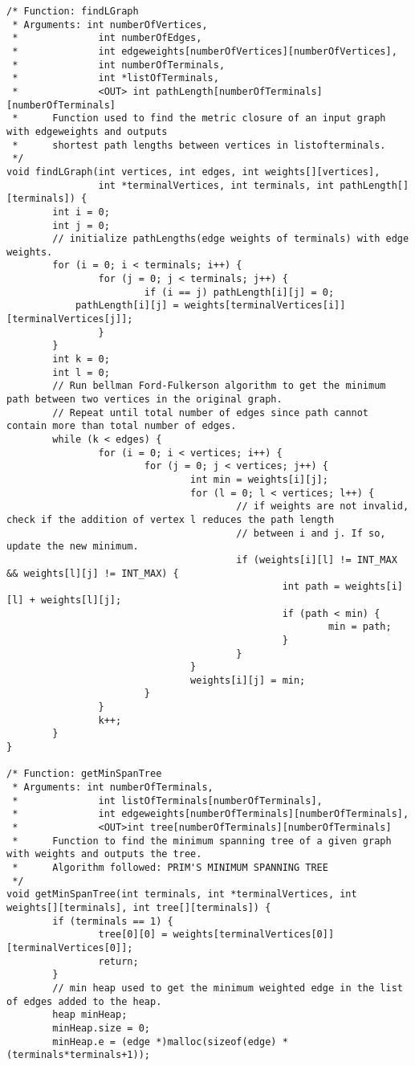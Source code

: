 \documentclass[a4paper]{article}
\begin{document}
\begin{lstlisting}
/* Function: findLGraph
 * Arguments: int numberOfVertices,
 *              int numberOfEdges,
 *              int edgeweights[numberOfVertices][numberOfVertices],
 *              int numberOfTerminals,
 *              int *listOfTerminals,
 *              <OUT> int pathLength[numberOfTerminals][numberOfTerminals]
 *      Function used to find the metric closure of an input graph with edgeweights and outputs
 *      shortest path lengths between vertices in listofterminals.
 */
void findLGraph(int vertices, int edges, int weights[][vertices],
                int *terminalVertices, int terminals, int pathLength[][terminals]) {
        int i = 0;
        int j = 0;
        // initialize pathLengths(edge weights of terminals) with edge weights.
        for (i = 0; i < terminals; i++) {
                for (j = 0; j < terminals; j++) {
                        if (i == j) pathLength[i][j] = 0;
			pathLength[i][j] = weights[terminalVertices[i]][terminalVertices[j]];
                }
        }
        int k = 0;
        int l = 0;
        // Run bellman Ford-Fulkerson algorithm to get the minimum path between two vertices in the original graph.
        // Repeat until total number of edges since path cannot contain more than total number of edges.
        while (k < edges) {
                for (i = 0; i < vertices; i++) {
                        for (j = 0; j < vertices; j++) {
                                int min = weights[i][j];
                                for (l = 0; l < vertices; l++) {
                                        // if weights are not invalid, check if the addition of vertex l reduces the path length
                                        // between i and j. If so, update the new minimum.
                                        if (weights[i][l] != INT_MAX && weights[l][j] != INT_MAX) {
                                                int path = weights[i][l] + weights[l][j];
                                                if (path < min) {
                                                        min = path;
                                                }
                                        }
                                }
                                weights[i][j] = min;
                        }
                }
                k++;
        }
}

/* Function: getMinSpanTree
 * Arguments: int numberOfTerminals,
 *              int listOfTerminals[numberOfTerminals],
 *              int edgeweights[numberOfTerminals][numberOfTerminals],
 *              <OUT>int tree[numberOfTerminals][numberOfTerminals]
 *      Function to find the minimum spanning tree of a given graph with weights and outputs the tree.
 *      Algorithm followed: PRIM'S MINIMUM SPANNING TREE
 */
void getMinSpanTree(int terminals, int *terminalVertices, int weights[][terminals], int tree[][terminals]) {
        if (terminals == 1) {
                tree[0][0] = weights[terminalVertices[0]][terminalVertices[0]];
                return;
        }
        // min heap used to get the minimum weighted edge in the list of edges added to the heap.
        heap minHeap;
        minHeap.size = 0;
        minHeap.e = (edge *)malloc(sizeof(edge) * (terminals*terminals+1));


\end{lstlisting}
\end{document}
